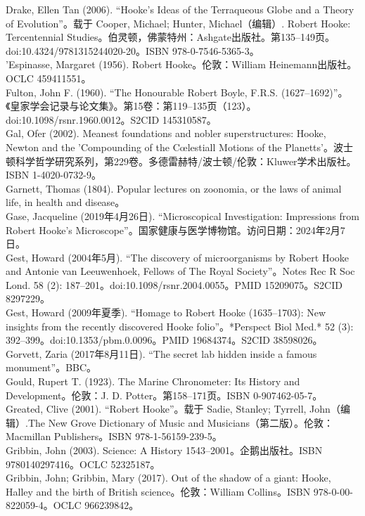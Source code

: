 Drake, Ellen Tan (2006). “Hooke's Ideas of the Terraqueous Globe and a Theory of Evolution”。载于 Cooper, Michael; Hunter, Michael（编辑）. Robert Hooke: Tercentennial Studies。伯灵顿，佛蒙特州：Ashgate出版社。第135–149页。doi:10.4324/9781315244020-20。ISBN 978-0-7546-5365-3。\\
'Espinasse, Margaret (1956). Robert Hooke。伦敦：William Heinemann出版社。OCLC 459411551。\\
Fulton, John F. (1960). “The Honourable Robert Boyle, F.R.S. (1627–1692)”。《皇家学会记录与论文集》。第15卷：第119–135页（123）。doi:10.1098/rsnr.1960.0012。S2CID 145310587。\\
Gal, Ofer (2002). Meanest foundations and nobler superstructures: Hooke, Newton and the 'Compounding of the Cœlestiall Motions of the Planetts'。波士顿科学哲学研究系列，第229卷。多德雷赫特/波士顿/伦敦：Kluwer学术出版社。ISBN 1-4020-0732-9。\\
Garnett, Thomas (1804). Popular lectures on zoonomia, or the laws of animal life, in health and disease。\\
Gase, Jacqueline (2019年4月26日). “Microscopical Investigation: Impressions from Robert Hooke's Microscope”。国家健康与医学博物馆。访问日期：2024年2月7日。\\ 
Gest, Howard (2004年5月). “The discovery of microorganisms by Robert Hooke and Antonie van Leeuwenhoek, Fellows of The Royal Society”。Notes Rec R Soc Lond. 58 (2): 187–201。doi:10.1098/rsnr.2004.0055。PMID 15209075。S2CID 8297229。\\
Gest, Howard (2009年夏季). “Homage to Robert Hooke (1635–1703): New insights from the recently discovered Hooke folio”。*Perspect Biol Med.* 52 (3): 392–399。doi:10.1353/pbm.0.0096。PMID 19684374。S2CID 38598026。\\ 
Gorvett, Zaria (2017年8月11日). “The secret lab hidden inside a famous monument”。BBC。\\
Gould, Rupert T. (1923). The Marine Chronometer: Its History and Development。伦敦：J. D. Potter。第158–171页。ISBN 0-907462-05-7。\\
Greated, Clive (2001). “Robert Hooke”。载于 Sadie, Stanley; Tyrrell, John（编辑）.The New Grove Dictionary of Music and Musicians（第二版）。伦敦：Macmillan Publishers。ISBN 978-1-56159-239-5。\\
 Gribbin, John (2003). Science: A History 1543–2001。企鹅出版社。ISBN 9780140297416。OCLC 52325187。\\
Gribbin, John; Gribbin, Mary (2017). Out of the shadow of a giant: Hooke, Halley and the birth of British science。伦敦：William Collins。ISBN 978-0-00-822059-4。OCLC 966239842。\\

